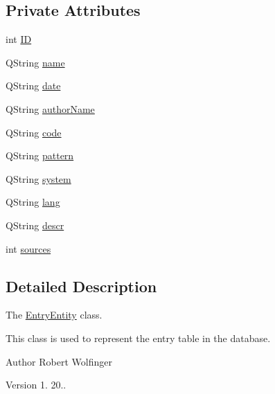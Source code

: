 \subsection*{Private Attributes}
\begin{DoxyCompactItemize}
\item 
int \hyperlink{class_entry_entity_a0353f8e056e80e3277f1cc6c17d2e071}{I\+D}
\item 
Q\+String \hyperlink{class_entry_entity_aa56cd8b59742ac7970d5344b93ae88a0}{name}
\item 
Q\+String \hyperlink{class_entry_entity_ad5ebe98873fec2e521b5df2b31a4b7b6}{date}
\item 
Q\+String \hyperlink{class_entry_entity_abeb114f6b0cfe1678a36e998e21434bf}{author\+Name}
\item 
Q\+String \hyperlink{class_entry_entity_a12393012ebcfc513af6eda5d95d9ccdb}{code}
\item 
Q\+String \hyperlink{class_entry_entity_a65f0a241d2a05f7b2da01e5868acfe5c}{pattern}
\item 
Q\+String \hyperlink{class_entry_entity_ab925c61d96e3e82745d185e931ef1e64}{system}
\item 
Q\+String \hyperlink{class_entry_entity_a5225b37537638e119ef901cad839390c}{lang}
\item 
Q\+String \hyperlink{class_entry_entity_ae87c35927889353ff5739e1fabe499bb}{descr}
\item 
int \hyperlink{class_entry_entity_af12b80bb0722b8a8d596f23289b5228a}{sources}
\end{DoxyCompactItemize}


\subsection{Detailed Description}
The \hyperlink{class_entry_entity}{Entry\+Entity} class. 

This class is used to represent the entry table in the database.

\begin{DoxyAuthor}{Author}
Robert Wolfinger 
\end{DoxyAuthor}
\begin{DoxyVersion}{Version}
1. 20.. 
\end{DoxyVersion}


